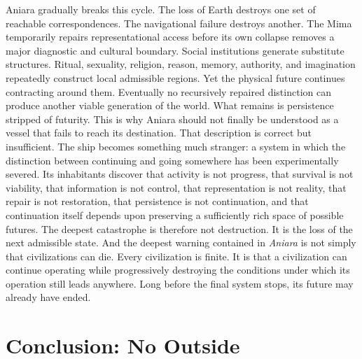 \documentclass[11pt,oneside]{book}
\theoremstyle{definition}
\theoremstyle{remark}
\begin{document}
Aniara gradually breaks this cycle. The loss of Earth destroys one set of reachable correspondences.
The navigational failure destroys another. The Mima temporarily repairs representational access
before its own collapse removes a major diagnostic and cultural boundary. Social institutions
generate substitute structures. Ritual, sexuality, religion, reason, memory, authority, and
imagination repeatedly construct local admissible regions. Yet the physical future continues
contracting around them. Eventually no recursively repaired distinction can produce another viable
generation of the world. What remains is persistence stripped of futurity. This is why Aniara should
not finally be understood as a vessel that fails to reach its destination. That description is
correct but insufficient. The ship becomes something much stranger: a system in which the
distinction between continuing and going somewhere has been experimentally severed. Its inhabitants
discover that activity is not progress, that survival is not viability, that information is not
control, that representation is not reality, that repair is not restoration, that persistence is not
continuation, and that continuation itself depends upon preserving a sufficiently rich space of
possible futures. The deepest catastrophe is therefore not destruction. It is the loss of the next
admissible state. And the deepest warning contained in \emph{Aniara} is not simply that
civilizations can die. Every civilization is finite. It is that a civilization can continue
operating while progressively destroying the conditions under which its operation still leads
anywhere. Long before the final system stops, its future may already have ended.

\chapter*{Conclusion: No Outside}
\label{chap:no-outside}
\end{document}
